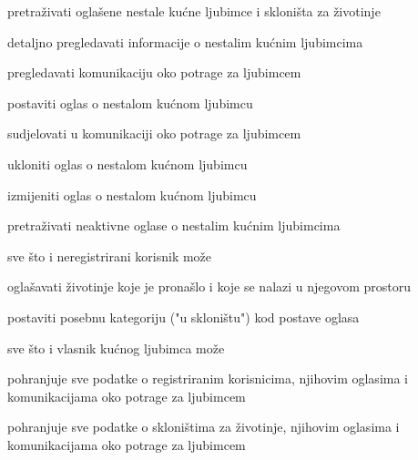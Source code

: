 			
			\begin{packed_enum}
				\item  {}
				
				\begin{packed_enum}
					
					\item pretraživati oglašene nestale kućne ljubimce i skloništa za životinje
					\item detaljno pregledavati informacije o nestalim kućnim ljubimcima
					\item  pregledavati komunikaciju oko potrage za ljubimcem
					
				\end{packed_enum}

                \item  {}
				
				\begin{packed_enum}
					
					\item postaviti oglas o nestalom kućnom ljubimcu
					\item sudjelovati u komunikaciji oko potrage za ljubimcem
					\item ukloniti oglas o nestalom kućnom ljubimcu
					\item izmijeniti oglas o nestalom kućnom ljubimcu
					\item pretraživati neaktivne oglase o nestalim kućnim ljubimcima
					\item sve što i neregistrirani korisnik može
					
				\end{packed_enum}

                \item  {}
				
				\begin{packed_enum}
					
					\item oglašavati životinje koje je pronašlo i koje se nalazi u njegovom prostoru
					\item postaviti posebnu kategoriju ("u skloništu") kod postave oglasa
					\item sve što i vlasnik kućnog ljubimca može
					
				\end{packed_enum}
			
				\item  {}
				
				\begin{packed_enum}
					
					\item pohranjuje sve podatke o registriranim korisnicima, njihovim oglasima i komunikacijama oko potrage za ljubimcem
					\item pohranjuje sve podatke o skloništima za životinje, njihovim oglasima i komunikacijama oko potrage za ljubimcem
					
				\end{packed_enum}
			\end{packed_enum}
			
